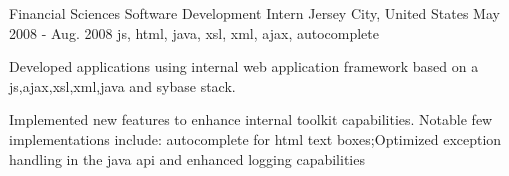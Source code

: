 \cventry
    {Financial Sciences} %
    {Software Development Intern} %
    {Jersey City, United States} %
    {May 2008 - Aug. 2008} %
    { js, html, java, xsl, xml, ajax, autocomplete }
    {
    \begin{cvitems} %
        \item { Developed applications using internal web application framework based on a js,ajax,xsl,xml,java and sybase stack. }
        \item { Implemented new features to enhance internal toolkit capabilities. Notable few implementations include: autocomplete for html text boxes;Optimized exception handling in the java api and enhanced logging capabilities }
    \end{cvitems}
    }